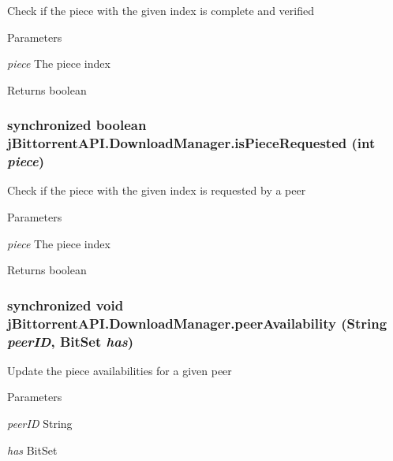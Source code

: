 \label{classj_bittorrent_a_p_i_1_1_download_manager_a4c5841b55bbd3b45e4fd89d049802579}
Check if the piece with the given index is complete and verified 
\begin{DoxyParams}{Parameters}
\item[{\em piece}]The piece index \end{DoxyParams}
\begin{DoxyReturn}{Returns}
boolean 
\end{DoxyReturn}
\hypertarget{classj_bittorrent_a_p_i_1_1_download_manager_a98e02f682d704a0aea83859210d561bd}{
\subsubsection[{isPieceRequested}]{\setlength{\rightskip}{0pt plus 5cm}synchronized boolean jBittorrentAPI.DownloadManager.isPieceRequested (int {\em piece})}}
\label{classj_bittorrent_a_p_i_1_1_download_manager_a98e02f682d704a0aea83859210d561bd}
Check if the piece with the given index is requested by a peer 
\begin{DoxyParams}{Parameters}
\item[{\em piece}]The piece index \end{DoxyParams}
\begin{DoxyReturn}{Returns}
boolean 
\end{DoxyReturn}
\hypertarget{classj_bittorrent_a_p_i_1_1_download_manager_ae8ce95ab44d21aeba95218aab682c21a}{
\subsubsection[{peerAvailability}]{\setlength{\rightskip}{0pt plus 5cm}synchronized void jBittorrentAPI.DownloadManager.peerAvailability (String {\em peerID}, \/  BitSet {\em has})}}
\label{classj_bittorrent_a_p_i_1_1_download_manager_ae8ce95ab44d21aeba95218aab682c21a}
Update the piece availabilities for a given peer 
\begin{DoxyParams}{Parameters}
\item[{\em peerID}]String \item[{\em has}]BitSet \end{DoxyParams}


